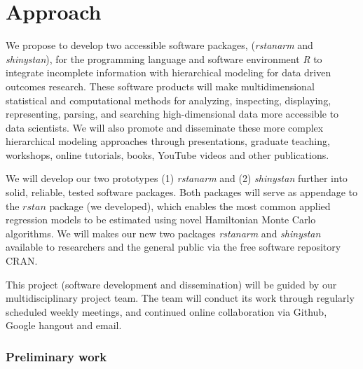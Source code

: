 \documentclass[11pt,notitlepage]{article}
\begin{document}
\part*{Approach}

We propose to develop two accessible software packages, (\textit{rstanarm} 
and \textit{shinystan}), for the programming language and software environment 
\textit{R} to integrate incomplete information with hierarchical modeling for 
data driven outcomes research. These software products will make multidimensional statistical and computational methods for analyzing, inspecting, displaying, 
representing, parsing, and searching high-dimensional data more accessible to 
data scientists. We will also promote and disseminate these more complex 
hierarchical modeling approaches through presentations, graduate teaching, 
workshops, online tutorials, books, YouTube videos and other publications.

We will develop our two prototypes (1) \textit{rstanarm} and (2) 
\textit{shinystan} further into solid, reliable, tested software packages. 
Both packages will serve as appendage to the $rstan$ package (we developed), 
which enables the most common applied regression models to be estimated using 
novel Hamiltonian Monte Carlo algorithms. We will makes our new two 
packages \textit{rstanarm} and \textit{shinystan} available to researchers 
and the general public via the free software repository CRAN. 

This project (software development and dissemination) will be guided by 
our multidisciplinary project team. The team will conduct its work through 
regularly scheduled weekly meetings, and continued online collaboration via 
Github, Google hangout and email. 



\section*{Preliminary work}
\end{document}
